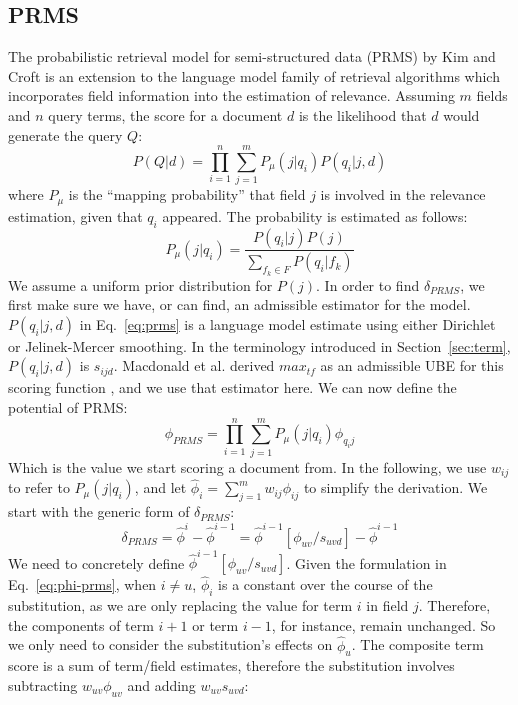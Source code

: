 \documentclass{sig-alternate}
\begin{document}
\subsection{PRMS} \label{appendix:prms}
The probabilistic retrieval model for semi-structured data (PRMS) by Kim and Croft \cite{kim-sigir-2010} is an extension to the language model family of retrieval algorithms which incorporates field information into the estimation of relevance. Assuming $m$ fields and $n$ query terms, the score for a document $d$ is the likelihood that $d$ would generate the query $Q$:
\begin{equation}
P(Q|d) = \prod_{i=1}^{n} \sum_{j=1}^{m} P_{\mu}(j|q_{i}) P(q_{i}|j,d) \label{eq:prms}
\end{equation}
where $P_{\mu}$ is the ``mapping probability'' that field $j$ is involved in the relevance estimation, given that $q_{i}$ appeared. The probability is estimated as follows:
\begin{equation*}
P_{\mu}(j|q_{i}) = \frac{P(q_{i}|j)P(j)}{\sum_{f_{k} \in F} P(q_{i}|f_{k})} 
\end{equation*}
We assume a uniform prior distribution for $P(j)$. In order to find $\delta_{PRMS}$, we first make sure we have, or can find, an admissible estimator for the model. $P(q_{i}|j,d)$ in Eq.~\ref{eq:prms} is a language model estimate using either Dirichlet or Jelinek-Mercer smoothing. In the terminology introduced in Section~\ref{sec:term}, $P(q_{i}|j,d)$ is $s_{ijd}$. Macdonald et al. derived $max_{tf}$ as an admissible UBE for this scoring function \cite{Macdonald-tois-2011}, and we use that estimator here. We can now define the potential of PRMS:
\begin{equation}
\phi_{PRMS} = \prod_{i=1}^{n} \sum_{j=1}^{m} P_{\mu}(j|q_{i}) \phi_{q_{i}j} \label{eq:phi-prms}
\end{equation}
Which is the value we start scoring a document from. In the following, we use $w_{ij}$ to refer to $P_{\mu}(j|q_{i})$, and  let ${\hat \phi}_{i} = \sum_{j=1}^{m} w_{ij} \phi_{ij}$ to simplify the derivation. We start with the generic form of  $\delta_{PRMS}$:
\begin{equation}
\delta_{PRMS} = {\hat \phi^{i}} - {\hat \phi^{i-1}} = {\hat \phi^{i-1}}[\phi_{uv}/s_{uvd}] - {\hat \phi^{i-1}}
\label{eq:delta-prms1}
\end{equation}
We need to concretely define ${\hat \phi^{i-1}}[\phi_{uv}/s_{uvd}]$. Given the formulation in Eq.~\ref{eq:phi-prms}, when $i \neq u$, ${\hat \phi}_{i}$ is a constant over the course of the substitution, as we are only replacing the value for term $i$ in field $j$. Therefore, the components of term $i+1$ or term $i-1$, for instance, remain unchanged. So we only need to consider the substitution's effects on ${\hat \phi}_{u}$. The composite term score is a sum of term/field estimates, therefore the substitution involves subtracting $w_{uv}\phi_{uv}$ and adding $w_{uv}s_{uvd}$:
\end{document}

